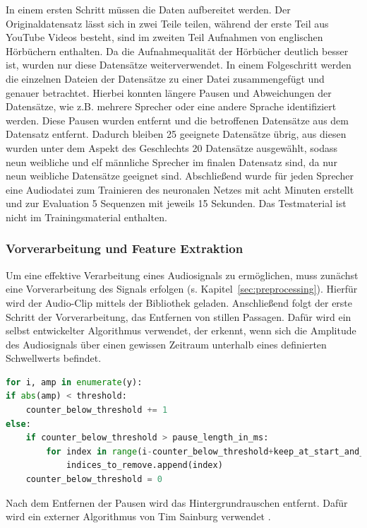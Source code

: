 In einem ersten Schritt müssen die Daten aufbereitet werden.
Der Originaldatensatz lässt sich in zwei Teile teilen, während der erste Teil aus YouTube Videos besteht, sind im zweiten Teil Aufnahmen von englischen Hörbüchern enthalten.
Da die Aufnahmequalität der Hörbücher deutlich besser ist, wurden nur diese Datensätze weiterverwendet.
In einem Folgeschritt werden die einzelnen Dateien der Datensätze zu einer Datei zusammengefügt und genauer betrachtet.
Hierbei konnten längere Pausen und Abweichungen der Datensätze, wie z.B. mehrere Sprecher oder eine andere Sprache identifiziert werden.
Diese Pausen wurden entfernt und die betroffenen Datensätze aus dem Datensatz entfernt.
Dadurch bleiben 25 geeignete Datensätze übrig, aus diesen wurden unter dem Aspekt des Geschlechts 20 Datensätze ausgewählt, sodass neun weibliche und elf männliche Sprecher im finalen Datensatz sind, da nur neun weibliche Datensätze geeignet sind.
Abschließend wurde für jeden Sprecher eine Audiodatei zum Trainieren des neuronalen Netzes mit acht Minuten erstellt und zur Evaluation 5 Sequenzen mit jeweils 15 Sekunden.
Das Testmaterial ist nicht im Trainingsmaterial enthalten.

\subsubsection{Vorverarbeitung und Feature Extraktion}

Um eine effektive Verarbeitung eines Audiosignals zu ermöglichen, muss zunächst eine Vorverarbeitung des Signals erfolgen (s. Kapitel~\ref{sec:preprocessing}).
Hierfür wird der Audio-Clip mittels der Bibliothek  geladen.
Anschließend folgt der erste Schritt der Vorverarbeitung, das Entfernen von stillen Passagen.
Dafür wird ein selbst entwickelter Algorithmus verwendet, der erkennt, wenn sich die Amplitude des Audiosignals über einen gewissen Zeitraum unterhalb eines definierten Schwellwerts befindet.

\begin{lstlisting}[language=Python,numbers=none,caption=Remove Silence,label=lst-remove-silence]
for i, amp in enumerate(y):
if abs(amp) < threshold:
    counter_below_threshold += 1
else:
    if counter_below_threshold > pause_length_in_ms:
        for index in range(i-counter_below_threshold+keep_at_start_and_end, i-keep_at_start_and_end):
            indices_to_remove.append(index)
    counter_below_threshold = 0
\end{lstlisting}

Nach dem Entfernen der Pausen wird das Hintergrundrauschen entfernt.
Dafür wird ein externer Algorithmus von Tim Sainburg verwendet \autocite[][]{sainburg_timsainbnoisereduce_2019}.

